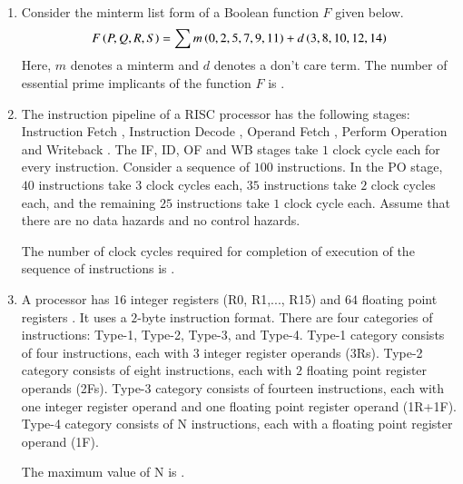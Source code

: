\documentclass[journal,12pt,onecolumn]{IEEEtran}
\theoremstyle{remark}
\begin{document}
\begin{enumerate}
\hfill{}

\item Consider the minterm list form of a Boolean function $F$ given below.
$$ F\left(P, Q, R, S\right) = \sum m\left(0, 2, 5, 7, 9, 11\right) + d\left(3, 8, 10, 12, 14\right) $$
Here, $m$ denotes a minterm and $d$ denotes a don't care term. The number of essential prime implicants of the function $F$ is \underline{\hspace{2cm}}.
\hfill{}

   \item The instruction pipeline of a RISC processor has the following stages: Instruction Fetch , Instruction Decode , Operand Fetch , Perform Operation  and Writeback . The IF, ID, OF and WB stages take $1$ clock cycle each for every instruction. Consider a sequence of $100$ instructions. In the PO stage, $40$ instructions take $3$ clock cycles each, $35$ instructions take $2$ clock cycles each, and the remaining $25$ instructions take $1$ clock cycle each. Assume that there are no data hazards and no control hazards.

The number of clock cycles required for completion of execution of the sequence of instructions is \underline{\hspace{2cm}}.

\hfill{}

\item A processor has $16$ integer registers (R0, R1,..., R15) and $64$ floating point registers . It uses a $2$-byte instruction format. There are four categories of instructions: Type-1, Type-2, Type-3, and Type-4. Type-1 category consists of four instructions, each with $3$ integer register operands (3Rs). Type-2 category consists of eight instructions, each with $2$ floating point register operands (2Fs). Type-3 category consists of fourteen instructions, each with one integer register operand and one floating point register operand (1R+1F). Type-4 category consists of N instructions, each with a floating point register operand (1F).

The maximum value of N is \underline{\hspace{2cm}}.

\hfill{}


\end{enumerate}
\end{document}
